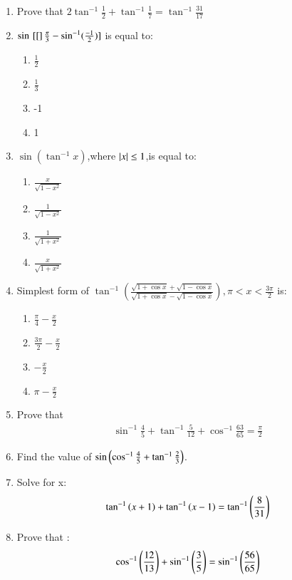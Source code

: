 \begin{enumerate}
\hfill{}\item Prove that $2\tan^{-1}\frac{1}{2} + \tan^{-1}\frac{1}{7} = \tan^{-1}\frac{31}{17}$

\hfill{}\item $ \sin {}\left[[\right]\frac{\pi}{3}-\sin^{-1}(\frac{-1}{2})] $ is equal to:

\begin{enumerate}

\item $\frac{1}{2}$
\item $\frac{1}{3}$
\item -1
\item 1

\end{enumerate}

\hfill{}\item $ \sin(\tan^{-1}x)$,where $\left\vert x\right\vert \le 1 $,is equal to:

\begin{enumerate}

\item$\frac{x}{\sqrt{1-x^2}}$
\item$\frac{1}{\sqrt{1-x^2}}$ 
\item$\frac{1}{\sqrt{1+x^2}}$
\item$\frac{x}{\sqrt{1+x^2}}$

\end{enumerate}  

\hfill{}\item Simplest form of $ \tan^{-1}(\frac{\sqrt{1+\cos x}+\sqrt{1-\cos x}}{\sqrt{1+\cos x}- \sqrt {1- \cos x}}) , \pi < x < \frac{3\pi}{2}$ is:

\begin{enumerate}

  \item$\frac{\pi}{4} - \frac{x}{2}$
  \item$\frac{3\pi}{2} - \frac{x}{2}$
  \item$-\frac{x}{2}$
  \item${\pi} - \frac{x}{2}$

\end{enumerate}
\hfill{}
\item Prove that 
\begin{align*}
    \sin^{-1}\frac{4}{5}+\tan^{-1}\frac{5}{12}+\cos^{-1}\frac{63}{65}=\frac{\pi}{2}
\end{align*}
\hfill{}
\item Find the value of $\sin\left(\cos^{-1}{\frac{4}{5}}+{\tan^{-1}{\frac{2}{3}}}\right)$.
\hfill{}\item Solve for x:
\begin{align*}
\tan^{-1}\left(x+1\right)+\tan^{-1}\left(x-1\right)=\tan^{-1}\left(\frac{8}{31}\right)
\end{align*}
\hfill{}\item Prove that :
\begin{align*}
\cos^{-1}\left(\frac{12}{13}\right)+\sin^{-1}\left(\frac{3}{5}\right)=\sin^{-1} \left(\frac{56}{65}\right)
\end{align*}
\hfill{}


\end{enumerate}
